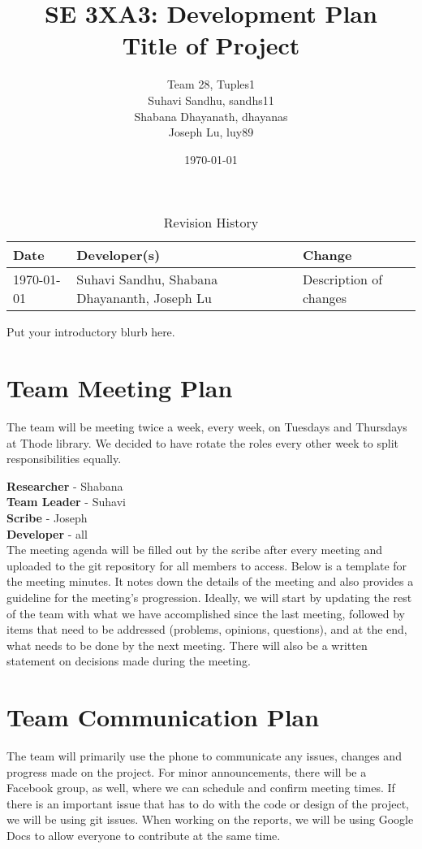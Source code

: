 \documentclass{article}
\title{SE 3XA3: Development Plan\\Title of Project}
\author{Team 28, Tuples1
		\\ Suhavi Sandhu, sandhs11
		\\ Shabana Dhayanath, dhayanas
		\\ Joseph Lu, luy89
}
\date{\today}
\begin{document}
\begin{table}[hp]
\caption{Revision History} \label{TblRevisionHistory}
\begin{tabularx}{\textwidth}{llX}
\toprule
\textbf{Date} & \textbf{Developer(s)} & \textbf{Change}\\
\midrule
\today & Suhavi Sandhu, Shabana Dhayananth, Joseph Lu & Description of changes\\
\bottomrule
\end{tabularx}
\end{table}

\newpage

\maketitle

Put your introductory blurb here.

\section{Team Meeting Plan}
The team will be meeting twice a week, every week, on Tuesdays and Thursdays at Thode library. We decided to have rotate the roles every other week to split responsibilities equally.

\textbf{Researcher} - Shabana\\
\textbf{Team Leader} - Suhavi\\
\textbf{Scribe} - Joseph\\
\textbf{Developer} - all\\

The meeting agenda will be filled out by the scribe after every meeting and uploaded to the git repository for all members to access. Below is a template for the meeting minutes. It notes down the details of the meeting and also provides a guideline for the meeting’s progression. Ideally, we will start by updating the rest of the team with what we have accomplished since the last meeting, followed by items that need to be addressed (problems, opinions, questions), and at the end, what needs to be done by the next meeting. There will also be a written statement on decisions made during the meeting.

\section{Team Communication Plan}

The team will primarily use the phone to communicate any issues, changes and progress made on the project. For minor announcements, there will be a Facebook group, as well, where we can schedule and confirm meeting times. If there is an important issue that has to do with the code or design of the project, we will be using git issues. When working on the reports, we will be using Google Docs to allow everyone to contribute at the same time.
\end{document}
